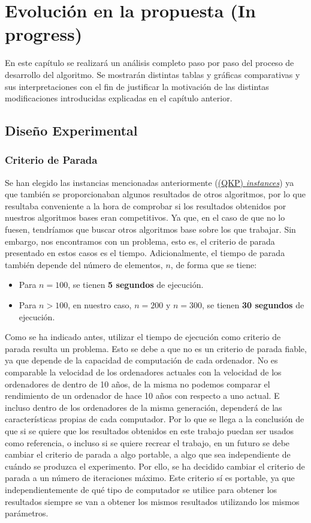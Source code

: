 \chapter{Evolución en la propuesta \color{red}(In progress)\color{black}}

En este capítulo se realizará un análisis completo paso por paso del proceso de desarrollo del algoritmo. 
Se mostrarán distintas tablas y gráficas comparativas y sus interpretaciones con el fin de justificar la motivación de las distintas modificaciones introducidas explicadas en el capítulo anterior.

\section{Diseño Experimental}
\subsection{Criterio de Parada}

Se han elegido las instancias mencionadas anteriormente (\href{http://cedric.cnam.fr/~soutif/QKP/QKP.html}{(QKP) \textit{instances}}) ya que también se proporcionaban algunos resultados de otros algoritmos, por lo que resultaba conveniente a la hora de comprobar si los resultados obtenidos por nuestros algoritmos bases eran competitivos. 
Ya que, en el caso de que no lo fuesen, tendríamos que buscar otros algoritmos base sobre los que trabajar.
Sin embargo, nos encontramos con un problema, esto es, el criterio de parada presentado en estos casos es el tiempo.
Adicionalmente, el tiempo de parada también depende del número de elementos, $n$, de forma que se tiene:
\begin{itemize}
\item Para $n = 100$, se tienen \textbf{5 segundos} de ejecución.
\item Para $n > 100$, en nuestro caso, $n = 200$ y $n = 300$, se tienen \textbf{30 segundos} de ejecución.
\end{itemize}

Como se ha indicado antes, utilizar el tiempo de ejecución como criterio de parada resulta un problema. 
Esto se debe a que no es un criterio de parada fiable, ya que depende de la capacidad de computación de cada ordenador. 
No es comparable la velocidad de los ordenadores actuales con la velocidad de los ordenadores de dentro de 10 años, de la misma no podemos comparar el rendimiento de un ordenador de hace 10 años con respecto a uno actual. 
E incluso dentro de los ordenadores de la misma generación, dependerá de las características propias de cada computador. 
Por lo que se llega a la conclusión de que si se quiere que los resultados obtenidos en este trabajo puedan ser usados como referencia, o incluso si se quiere recrear el trabajo, en un futuro se debe cambiar el criterio de parada a algo portable, a algo que sea independiente de cuándo se produzca el experimento. 
Por ello, se ha decidido cambiar el criterio de parada a un número de iteraciones máximo. 
Este criterio sí es portable, ya que independientemente de qué tipo de computador se utilice para obtener los resultados siempre se van a obtener los mismos resultados utilizando los mismos parámetros.

